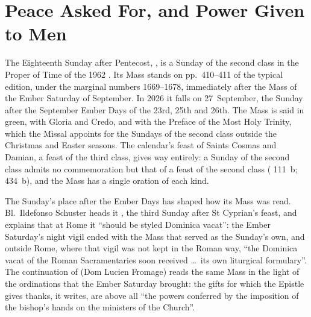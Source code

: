 \section{Peace Asked For, and Power Given to Men}
\label{sec:opening}

The Eighteenth Sunday after Pentecost, , is a Sunday of the second class in the Proper of Time of the 1962
. Its Mass stands on pp.~410--411 of the typical
edition, under the marginal numbers 1669--1678, immediately after the Mass of
the Ember Saturday of September. In 2026 it falls on 27~September, the Sunday
after the September Ember Days of the 23rd, 25th and 26th. The Mass is said in
green, with Gloria and Credo, and with the Preface of the Most Holy Trinity,
which the Missal appoints for the Sundays of the second class outside the
Christmas and Easter seasons. The calendar's feast of Saints Cosmas and Damian,
a feast of the third class, gives way entirely: a Sunday of the second class
admits no commemoration but that of a feast of the second class
( 111~b;  434~b),
and the Mass has a single oration of each kind.

The Sunday's place after the Ember Days has shaped how its Mass was read.
Bl.\ Ildefonso Schuster heads it ,
the third Sunday after St Cyprian's feast, and explains that at Rome it
``should be styled Dominica vacat'': the Ember Saturday's night vigil ended
with the Mass that served as the Sunday's own, and outside Rome, where that
vigil was not kept in the Roman way, ``the Dominica vacat of the Roman
Sacramentaries soon received \dots\ its own liturgical formulary''. The
continuation of  (Dom Lucien Fromage) reads the same
Mass in the light of the ordinations that the Ember Saturday brought: the gifts
for which the Epistle gives thanks, it writes, are above all ``the powers
conferred by the imposition of the bishop's hands on the ministers of the
Church''.

